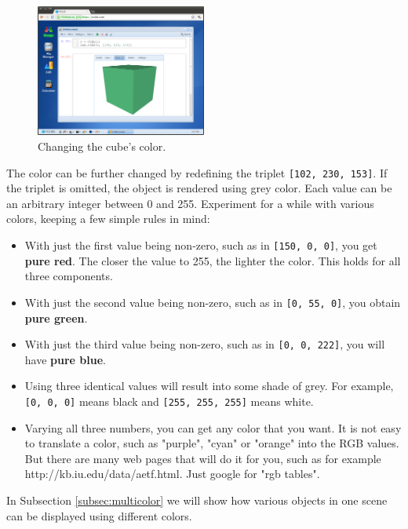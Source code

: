 \documentclass{article}
\begin{document}
\begin{figure}[!ht]
\begin{center}
\includegraphics[width=0.5\textwidth]{img/cube2.png}
\end{center}
\vspace{-2mm}
\caption{Changing the cube's color.}
\vspace{2mm}
\label{fig:cube2}
\end{figure}
\noindent
The color can be further changed by redefining the triplet {\tt [102, 230, 153]}. 
If the triplet is omitted, the object is rendered using grey color. Each value can 
be an arbitrary integer between 0 and 255. Experiment for a while with various colors, keeping a few 
simple rules in mind:

\begin{itemize}
\item With just the first value being non-zero, such as in {\tt [150, 0, 0]},
      you get {\bf pure red}. The closer the value to 255, the lighter the color.
      This holds for all three components.
\item With just the second value being non-zero, such as in {\tt [0, 55, 0]},
      you obtain {\bf pure green}.
\item With just the third value being non-zero, such as in {\tt [0, 0, 222]},
      you will have {\bf pure blue}. 
\item Using three identical values will result into some shade of grey. For 
      example, {\tt [0, 0, 0]}
      means black and {\tt [255, 255, 255]} means white.
\item Varying all three numbers, you can get any color that you want. It is not 
      easy to translate a color, such as "purple", "cyan" or "orange" into the RGB
      values. But there are many web pages that will do it for you, such as for
      example http://kb.iu.edu/data/aetf.html. Just google for "rgb tables".
\end{itemize}
In Subsection \ref{subsec:multicolor} we will show how various objects in
one scene can be displayed using different colors.
\end{document}
